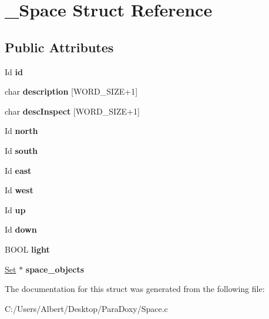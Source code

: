 \hypertarget{struct___space}{\section{\-\_\-\-Space Struct Reference}
\label{struct___space}
}
\subsection*{Public Attributes}
\begin{DoxyCompactItemize}
\item 
\hypertarget{struct___space_a70cb461deb9ac073e401b607339b567f}{Id {\bfseries id}}\label{struct___space_a70cb461deb9ac073e401b607339b567f}

\item 
\hypertarget{struct___space_a41a1dbfab1d88b732db50d7335c2f328}{char {\bfseries description} \mbox{[}W\-O\-R\-D\-\_\-\-S\-I\-Z\-E+1\mbox{]}}\label{struct___space_a41a1dbfab1d88b732db50d7335c2f328}

\item 
\hypertarget{struct___space_a0f37b32d43a15dd3a6f4431ec5a96129}{char {\bfseries desc\-Inspect} \mbox{[}W\-O\-R\-D\-\_\-\-S\-I\-Z\-E+1\mbox{]}}\label{struct___space_a0f37b32d43a15dd3a6f4431ec5a96129}

\item 
\hypertarget{struct___space_ae5ebe53ce79514d7d2d93911e0159252}{Id {\bfseries north}}\label{struct___space_ae5ebe53ce79514d7d2d93911e0159252}

\item 
\hypertarget{struct___space_a646b68c22a0bbf1685033c96109d31d1}{Id {\bfseries south}}\label{struct___space_a646b68c22a0bbf1685033c96109d31d1}

\item 
\hypertarget{struct___space_a41ce2bf33cf0c157b358221f094ee05b}{Id {\bfseries east}}\label{struct___space_a41ce2bf33cf0c157b358221f094ee05b}

\item 
\hypertarget{struct___space_a20c1d259e93b44e24ba82982e142eb9b}{Id {\bfseries west}}\label{struct___space_a20c1d259e93b44e24ba82982e142eb9b}

\item 
\hypertarget{struct___space_af2a50145d93dfb8d82b8b42138dc57a1}{Id {\bfseries up}}\label{struct___space_af2a50145d93dfb8d82b8b42138dc57a1}

\item 
\hypertarget{struct___space_ac20194f418676bb03cca7e0fdcb6f559}{Id {\bfseries down}}\label{struct___space_ac20194f418676bb03cca7e0fdcb6f559}

\item 
\hypertarget{struct___space_a15f20d8ccdec846b9a4f77464748bff5}{B\-O\-O\-L {\bfseries light}}\label{struct___space_a15f20d8ccdec846b9a4f77464748bff5}

\item 
\hypertarget{struct___space_a08b526f6f3dfeda7068eaa86a7f9a335}{\hyperlink{struct___set}{Set} $\ast$ {\bfseries space\-\_\-objects}}\label{struct___space_a08b526f6f3dfeda7068eaa86a7f9a335}

\end{DoxyCompactItemize}


The documentation for this struct was generated from the following file\-:\begin{DoxyCompactItemize}
\item 
C\-:/\-Users/\-Albert/\-Desktop/\-Para\-Doxy/Space.\-c\end{DoxyCompactItemize}
